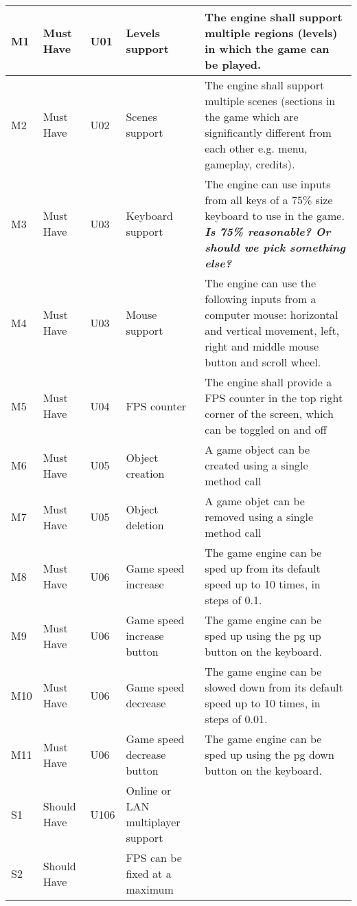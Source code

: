 \documentclass{article} %
\begin{document}
\begin{longtable}{|p{}|p{}|p{}|p{}|p{}|}
        M1 & Must Have & U01 & Levels support & The engine shall support multiple regions (levels) in which the game can be played. \\ \hline
        M2 & Must Have & U02 & Scenes support & The engine shall support multiple scenes (sections in the game which are significantly different from each other e.g. menu, gameplay, credits). \\ \hline
        M3 & Must Have & U03 & Keyboard support & The engine can use inputs from all keys of a 75\% size keyboard to use in the game. \textit{\textbf{Is 75\% reasonable? Or should we pick something else?}} \\ \hline
        M4 & Must Have & U03 & Mouse support & The engine can use the following inputs from a computer mouse: horizontal and vertical movement, left, right and middle mouse button and scroll wheel. \\ \hline
        M5 & Must Have & U04 & FPS counter & The engine shall provide a FPS counter in the top right corner of the screen, which can be toggled on and off \\ \hline
        M6 & Must Have & U05 & Object creation & A game object can be created using a single method call \\ \hline
        M7 & Must Have & U05 & Object deletion & A game objet can be removed using a single method call \\ \hline
        M8 & Must Have & U06 & Game speed increase & The game engine can be sped up from its default speed up to 10 times, in steps of 0.1. \\ \hline
        M9 & Must Have & U06 & Game speed increase button & The game engine can be sped up using the pg up button on the keyboard. \\ \hline
        M10 & Must Have & U06 & Game speed decrease & The game engine can be slowed down from its default speed up to 10 times, in steps of 0.01. \\ \hline
        M11 & Must Have & U06 & Game speed decrease button & The game engine can be sped up using the pg down button on the keyboard. \\ \hline
        S1 & Should Have & U106 & Online or LAN multiplayer support & \\ \hline
        S2 & Should Have &  & FPS can be fixed at a maximum & \\ \hline
        \end{longtable}
    \newpage
\end{document}
